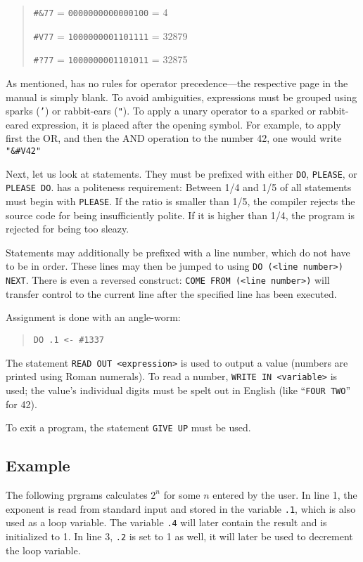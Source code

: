 \begin{quotation}
\texttt{\#\&77} = \texttt{0000000000000100} = 4

\texttt{\#V77} = \texttt{1000000001101111} = 32879

\texttt{\#?77} = \texttt{1000000001101011} = 32875
\end{quotation}

As mentioned, \ic{} has no rules for operator precedence---the respective page in the manual is simply blank. To avoid ambiguities, expressions must be grouped using sparks (\texttt{'}) or rabbit-ears (\texttt{"}). To apply a unary operator to a sparked or rabbit-eared expression, it is placed after the opening symbol. For example, to apply first the OR, and then the AND operation to the number 42, one would write \texttt{"\&\#V42"}

Next, let us look at statements. They must be prefixed with either \texttt{DO}, \texttt{PLEASE}, or \texttt{PLEASE DO}. \ic{} has a politeness requirement: Between 1/4 and 1/5 of all statements must begin with \texttt{PLEASE}. If the ratio is smaller than 1/5, the compiler rejects the source code for being insufficiently polite. If it is higher than 1/4, the program is rejected for being too sleazy.

Statements may additionally be prefixed with a line number, which do not have to be in order. These lines may then be jumped to using \texttt{DO (<line number>) NEXT}. There is even a reversed construct: \texttt{COME FROM (<line number>)} will transfer control to the current line after the specified line has been executed.

Assignment is done with an angle-worm:

\begin{quotation}
    \texttt{DO .1 <- \#1337}
\end{quotation}

The statement \texttt{READ OUT <expression>} is used to output a value (numbers are printed using Roman numerals). To read a number, \texttt{WRITE IN <variable>} is used; the value's individual digits must be spelt out in English (like “\texttt{FOUR TWO}” for 42).

To exit a program, the statement \texttt{GIVE UP} must be used.

\subsection{Example}

The following prgrams calculates $2^n$ for some $n$ entered by the user. In line 1, the exponent is read from standard input and stored in the variable \texttt{.1}, which is also used as a loop variable. The variable \texttt{.4} will later contain the result and is initialized to 1. In line 3, \texttt{.2} is set to 1 as well, it will later be used to decrement the loop variable.

